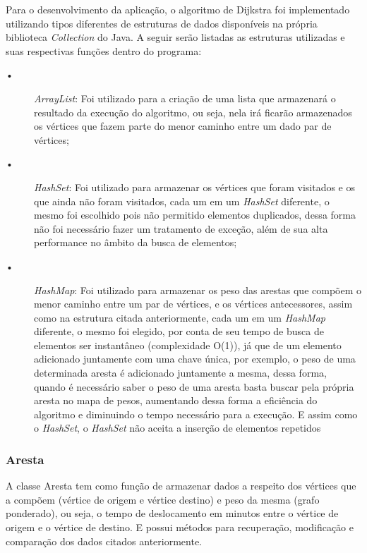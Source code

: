 \documentclass[12pt]{article}
\begin{document}
Para o desenvolvimento da aplicação, o algoritmo de Dijkstra foi implementado utilizando tipos diferentes de estruturas de dados disponíveis na própria biblioteca {\itshape Collection} do Java. A seguir serão listadas as estruturas utilizadas e suas respectivas funções dentro do programa: 
\begin{description}
\item[•] {\itshape ArrayList}: Foi utilizado para a criação de uma lista que armazenará o resultado da execução do algoritmo, ou seja, nela irá ficarão armazenados os vértices que fazem parte do menor caminho entre um dado par de vértices; 
\item[•] {\itshape HashSet}: Foi utilizado para armazenar os vértices que foram visitados e os que ainda não foram visitados, cada um em um {\itshape HashSet} diferente, o mesmo foi escolhido pois não permitido elementos duplicados, dessa forma não foi necessário fazer um tratamento de exceção, além de sua alta performance no âmbito da busca de elementos; 
\item[•] {\itshape HashMap}: Foi utilizado para armazenar os peso das arestas que compõem o menor caminho entre um par de vértices, e os vértices antecessores, assim como na estrutura citada anteriormente, cada um em um {\itshape HashMap} diferente, o mesmo foi elegido, por conta de seu tempo de busca de elementos ser instantâneo (complexidade O(1)), já que de um elemento adicionado juntamente com uma chave única, por exemplo, o peso de uma determinada aresta é adicionado juntamente a mesma, dessa forma, quando é necessário saber o peso de uma aresta basta buscar pela própria aresta no mapa de pesos, aumentando dessa forma a eficiência do algoritmo e diminuindo o tempo necessário para a execução. E assim como o {\itshape HashSet}, o {\itshape HashSet} não aceita a inserção de elementos repetidos
\end{description}

\subsubsection{Aresta}
A classe Aresta tem como função de armazenar dados a respeito dos vértices que a compõem (vértice de origem e vértice destino) e peso da mesma (grafo ponderado), ou seja, o tempo de deslocamento em minutos entre o vértice de origem e o vértice de destino. E possui métodos para recuperação, modificação e comparação dos dados citados anteriormente.
\end{document}

